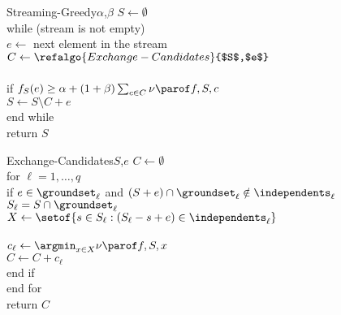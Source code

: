 \documentclass[oneside,letterpaper]{scrartcl} \usepackage{macros}
\newcommand{\mcard}{q}\newcommand{\nmat}{q}
\newcommand{\mindex}{\ell}
\begin{document}
\begin{figure}[t]
  \centering
  \begin{minipage}{6.9cm}
    \begin{framed}
      \begin{pseudocode}
        \begin{routine}{Streaming-Greedy}{$\alpha$,$\beta$}
          $S \gets \emptyset$\\
          while (stream is not empty) \+\\
          $e \gets $ next element in the stream\\
          $C \gets \refalgo{Exchange-Candidates}{$S$,$e$}$ \\\\
          if \begin{math}
            f_S(e) \geq \alpha + (1 + \beta) \sum_{c \in C} \incvalueof{f}{S}{c} \end{math} \\
          \> $S \gets S \setminus C + e$ \\
          \< end while \- \\
          return $S$
        \end{routine} \end{pseudocode}
      \vspace{.2ex}
    \end{framed}
  \end{minipage}
  \qquad
  \begin{minipage}{6.4cm}
    \begin{framed}
      \begin{pseudocode}
        \begin{routine}{Exchange-Candidates}{$S$,$e$}
          $C \gets \emptyset$\\
          for $\ell = 1,\dots, \mcard$ \\
          \> if $e \in \groundset_\mindex$ and $(S + e) \cap
          \groundset_\mindex
          \notin \independents_\mindex$\\
          \> \> $S_\ell = S \cap \groundset_\ell$\\
          \> \> $X \gets \setof{s \in S_\ell: (S_\ell - s + e) \in
            \independents_\ell}$\\
          \> \> \\
          \> \> $c_{\mindex} \gets \argmin_{x \in X} \incvalueof{f}{S}{x}$\\
          \> \> $C \gets C + c_{\mindex}$ \\
          \> end if \\
          end for\\
          return $C$
        \end{routine}
      \end{pseudocode}
    \end{framed}
  \end{minipage}
\end{figure}
\end{document}
